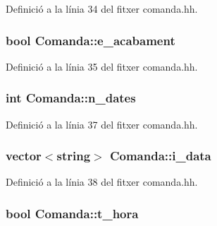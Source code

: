 Definició a la línia 34 del fitxer comanda.\-hh.

\hypertarget{class_comanda_a0f7472af37d7f6c24f74fbac60e4a696}{
\subsubsection[{e\-\_\-acabament}]{\setlength{\rightskip}{0pt plus 5cm}bool Comanda\-::e\-\_\-acabament\hspace{0.3cm}{\ttfamily [private]}}}\label{class_comanda_a0f7472af37d7f6c24f74fbac60e4a696}


Definició a la línia 35 del fitxer comanda.\-hh.

\hypertarget{class_comanda_a0a4e13d8edba10c69d1b058d8fc6a7c3}{
\subsubsection[{n\-\_\-dates}]{\setlength{\rightskip}{0pt plus 5cm}int Comanda\-::n\-\_\-dates\hspace{0.3cm}{\ttfamily [private]}}}\label{class_comanda_a0a4e13d8edba10c69d1b058d8fc6a7c3}


Definició a la línia 37 del fitxer comanda.\-hh.

\hypertarget{class_comanda_a06ee1d3173ee0ae52c588689e9263099}{
\subsubsection[{i\-\_\-data}]{\setlength{\rightskip}{0pt plus 5cm}vector$<$string$>$ Comanda\-::i\-\_\-data\hspace{0.3cm}{\ttfamily [private]}}}\label{class_comanda_a06ee1d3173ee0ae52c588689e9263099}


Definició a la línia 38 del fitxer comanda.\-hh.

\hypertarget{class_comanda_ae481194a2016e940e655173e897d214d}{
\subsubsection[{t\-\_\-hora}]{\setlength{\rightskip}{0pt plus 5cm}bool Comanda\-::t\-\_\-hora\hspace{0.3cm}{\ttfamily [private]}}}\label{class_comanda_ae481194a2016e940e655173e897d214d}


